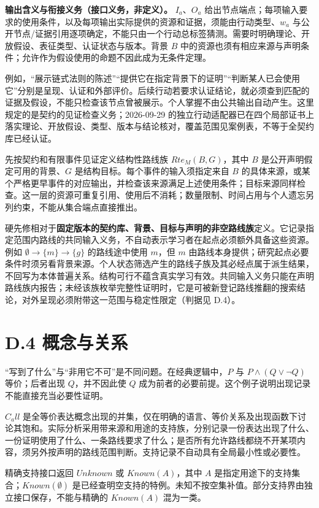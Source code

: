 \documentclass[UTF8,a4paper,zihao=-4,fontset=windows,openany]{ctexbook}
\def\mathrm#1{#1}%
\begin{document}
\textbf{输出含义与衔接义务（接口义务，非定义）。} \(I_a\)、\(O_a\) 给出节点端点；每项输入要求的使用条件，以及每项输出实际提供的资源和证据，须能由行动类型、\(w_a\) 与公开节点/证据引用逐项确定，不能只由一个行动总标签猜测。需要时明确理论、开放假设、表征类型、认证状态与版本。背景 \(B\) 中的资源也须有相应来源与声明条件；允许作为假设使用的命题不因此成为无条件定理。

例如，“展示链式法则的陈述”“提供它在指定背景下的证明”“判断某人已会使用它”分别是呈现、认证和外部评价。后续行动若要求认证结论，就必须查到匹配的证据及假设，不能只检查该节点曾被展示。个人掌握不由公共输出自动产生。这里规定的是契约的见证检查义务；2026-09-29 的独立行动适配器已在四个局部证书上落实理论、开放假设、类型、版本与结论核对，覆盖范围见案例表，不等于全契约库已经认证。

先按契约和有限事件见证定义结构性路线族 \(\mathrm{Rte}_M(B,G)\)，其中 \(B\) 是公开声明假定可用的背景、\(G\) 是结构目标。每个事件的输入须指定来自 \(B\) 的具体来源，或某个严格更早事件的对应输出，并检查该来源满足上述使用条件；目标来源同样检查。这一层的资源可重复引用、使用后不消耗；数量限制、时间占用与个人遗忘另列约束，不能从集合端点直接推出。

硬先修相对于\textbf{固定版本的契约库、背景、目标与声明的非空路线族}定义。它记录指定范围内路线的共同输入义务，不自动表示学习者在起点必须额外具备这些资源。例如 \(\emptyset\to\{m\}\to\{g\}\) 的路线途中使用 \(m\)，但 \(m\) 由路线本身提供；研究起点必要条件时须另看背景来源。个人状态筛选产生的路线子族及其必经点属于派生结果，不回写为本体普遍关系。结构可行不蕴含真实学习有效。共同输入义务只能在声明路线族内报告；未经该族枚举完整性证明时，它是可被新登记路线推翻的搜索结论，对外呈现必须附带这一范围与稳定性限定（判据见 D.4）。

\section{D.4 概念与关系}
“写到了什么”与“非用它不可”是不同问题。在经典逻辑中，\(P\) 与 \(P\land(Q\lor\neg Q)\) 等价；后者出现 \(Q\)，并不因此使 \(Q\) 成为前者的必要前提。这个例子说明出现记录不能直接充当必要性证明。

\(C_\mathrm{all}\) 是全等价表达概念出现的并集，仅在明确的语言、等价关系及出现函数下讨论其饱和。实际分析采用带来源和用途的支持族，分别记录一份表达出现了什么、一份证明使用了什么、一条路线要求了什么；是否所有允许路线都绕不开某项内容，须另外按声明的路线范围判断。支持记录不自动具有全局最小性或必要性。

精确支持接口返回 \(\mathrm{Unknown}\) 或 \(\mathrm{Known}(A)\)，其中 \(A\) 是指定用途下的支持集合；\(\mathrm{Known}(\emptyset)\) 是已经查明空支持的特例。未知不按空集补值。部分支持界由独立接口保存，不能与精确的 \(\mathrm{Known}(A)\) 混为一类。
\end{document}
